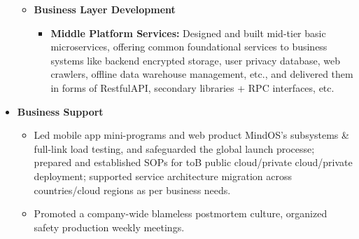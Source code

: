 \documentclass[letterpaper,11pt]{article}
\begin{document}
\begin{spacing}{1.0}
\begin{itemize}
\begin{itemize}
			\item \textbf{Business Layer Development}
			\begin{itemize}
				\item \textbf{Middle Platform Services: }Designed and built mid-tier basic microservices, offering common foundational services to business systems like backend encrypted storage, user privacy database,
				web crawlers, offline data warehouse management, etc., and delivered them in forms of RestfulAPI, secondary libraries + RPC interfaces, etc.
			\end{itemize}
		\end{itemize}
		\item \textbf{Business Support}
		\begin{itemize}
			\item Led mobile app mini-programs and web product MindOS’s subsystems \& full-link load testing, and safeguarded the global launch processe; prepared and established SOPs for toB public cloud/private cloud/private deployment; supported service architecture migration across countries/cloud regions as per business needs.
			\item Promoted a company-wide blameless postmortem culture, organized safety production weekly meetings.
		\end{itemize}
	\end{itemize}
	

\end{spacing}
\end{document}
